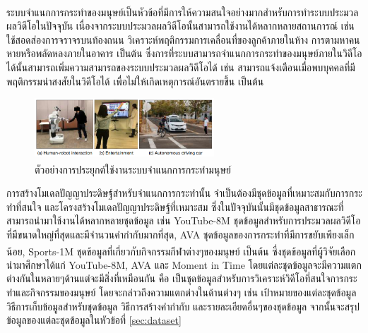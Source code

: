 ระบบจำแนกการกระทำของมนุษย์\textsuperscript{\cite{ma2017less}}เป็นหัวข้อที่มีการให้ความสนใจอย่างมากสำหรับการทำระบบประมวลผลวิดีโอในปัจจุบัน เนื่องจากระบบประมวลผลวิดีโอนั้นสามารถใช้งานได้หลากหลายสถานการณ์ เช่น ใช้สอดส่องการจราจรบนท้องถนน
วิเคราะห์พฤติกรรมการเคลื่อนที่ของลูกค้าภายในห้าง การตามหาคนหายหรือพลัดหลงภายในอาคาร เป็นต้น ซึ่งการที่ระบบสามารถจำแนกการกระทำของมนุษย์ภายในวิดีโอได้นั้นสามารถเพิ่มความสามารถของระบบประมวลผลวิดีโอได้
เช่น สามารถแจ้งเตือนเมื่อพบบุคคลที่มีพฤติกรรมน่าสงสัยในวิดีโอได้ เพื่อไม่ให้เกิดเหตุการณ์อันตรายขึ้น เป็นต้น

\begin{figure}[!ht]
	\centering
	\includegraphics[width=0.6\textwidth]{chapter2/images/video_analytics_ex.png}
	\caption{ตัวอย่างการประยุกต์ใช้งานระบบจำแนกการกระทำมนุษย์\textsuperscript{\cite{kong2018human}}}
	\label{fig:actioncls_ex}
\end{figure}

การสร้างโมเดลปัญญาประดิษฐ์สำหรับจำแนกการกระทำนั้น จำเป็นต้องมีชุดข้อมูลที่เหมาะสมกับการกระทำที่สนใจ และโครงสร้างโมเดลปัญญาประดิษฐ์ที่เหมาะสม
ซึ่งในปัจจุบันนั้นมีชุดข้อมูลสาธารณะที่สามารถนำมาใช้งานได้หลากหลายชุดข้อมูล เช่น YouTube-8M ชุดข้อมูลสำหรับการประมวลผลวิดีโอที่มีขนาดใหญ่ที่สุดและมีจำนวนคำกำกับมากที่สุด, 
AVA ชุดข้อมูลของการกระทำที่มีการขยับเพียงเล็กน้อย, Sports-1M\textsuperscript{\cite{karpathy2014large}} ชุดข้อมูลที่เกี่ยวกับกิจกรรมกีฬาต่างๆของมนุษย์ เป็นต้น ซึ่งชุดข้อมูลที่ผู้วิจัยเลือกนำมาศึกษาได้แก่ YouTube-8M, AVA และ Moment in Time
โดยแต่ละชุดข้อมูลจะมีความแตกต่างกันในหลายๆด้านแต่จะมีสิ่งที่เหมือนกัน คือ เป็นชุดข้อมูลสำหรับการวิเคราะห์วิดีโอที่สนใจการกระทำและกิจกรรมของมนุษย์ โดยจะกล่าวถึงความแตกต่างในด้านต่างๆ 
เช่น เป้าหมายของแต่ละชุดข้อมูล วิธีการเก็บข้อมูลสำหรับชุดข้อมูล วิธีการสร้างคำกำกับ และรายละเอียดอื่นๆของชุดข้อมูล จากนั้นจะสรุปข้อมูลของแต่ละชุดข้อมูลในหัวข้อที่ \ref{sec:dataset}